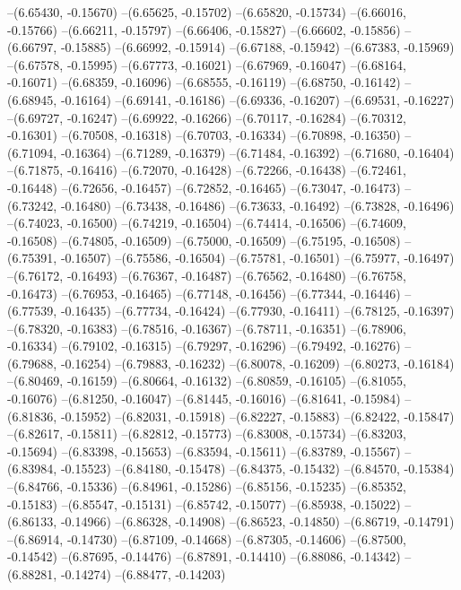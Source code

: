 --(6.65430, -0.15670)
--(6.65625, -0.15702)
--(6.65820, -0.15734)
--(6.66016, -0.15766)
--(6.66211, -0.15797)
--(6.66406, -0.15827)
--(6.66602, -0.15856)
--(6.66797, -0.15885)
--(6.66992, -0.15914)
--(6.67188, -0.15942)
--(6.67383, -0.15969)
--(6.67578, -0.15995)
--(6.67773, -0.16021)
--(6.67969, -0.16047)
--(6.68164, -0.16071)
--(6.68359, -0.16096)
--(6.68555, -0.16119)
--(6.68750, -0.16142)
--(6.68945, -0.16164)
--(6.69141, -0.16186)
--(6.69336, -0.16207)
--(6.69531, -0.16227)
--(6.69727, -0.16247)
--(6.69922, -0.16266)
--(6.70117, -0.16284)
--(6.70312, -0.16301)
--(6.70508, -0.16318)
--(6.70703, -0.16334)
--(6.70898, -0.16350)
--(6.71094, -0.16364)
--(6.71289, -0.16379)
--(6.71484, -0.16392)
--(6.71680, -0.16404)
--(6.71875, -0.16416)
--(6.72070, -0.16428)
--(6.72266, -0.16438)
--(6.72461, -0.16448)
--(6.72656, -0.16457)
--(6.72852, -0.16465)
--(6.73047, -0.16473)
--(6.73242, -0.16480)
--(6.73438, -0.16486)
--(6.73633, -0.16492)
--(6.73828, -0.16496)
--(6.74023, -0.16500)
--(6.74219, -0.16504)
--(6.74414, -0.16506)
--(6.74609, -0.16508)
--(6.74805, -0.16509)
--(6.75000, -0.16509)
--(6.75195, -0.16508)
--(6.75391, -0.16507)
--(6.75586, -0.16504)
--(6.75781, -0.16501)
--(6.75977, -0.16497)
--(6.76172, -0.16493)
--(6.76367, -0.16487)
--(6.76562, -0.16480)
--(6.76758, -0.16473)
--(6.76953, -0.16465)
--(6.77148, -0.16456)
--(6.77344, -0.16446)
--(6.77539, -0.16435)
--(6.77734, -0.16424)
--(6.77930, -0.16411)
--(6.78125, -0.16397)
--(6.78320, -0.16383)
--(6.78516, -0.16367)
--(6.78711, -0.16351)
--(6.78906, -0.16334)
--(6.79102, -0.16315)
--(6.79297, -0.16296)
--(6.79492, -0.16276)
--(6.79688, -0.16254)
--(6.79883, -0.16232)
--(6.80078, -0.16209)
--(6.80273, -0.16184)
--(6.80469, -0.16159)
--(6.80664, -0.16132)
--(6.80859, -0.16105)
--(6.81055, -0.16076)
--(6.81250, -0.16047)
--(6.81445, -0.16016)
--(6.81641, -0.15984)
--(6.81836, -0.15952)
--(6.82031, -0.15918)
--(6.82227, -0.15883)
--(6.82422, -0.15847)
--(6.82617, -0.15811)
--(6.82812, -0.15773)
--(6.83008, -0.15734)
--(6.83203, -0.15694)
--(6.83398, -0.15653)
--(6.83594, -0.15611)
--(6.83789, -0.15567)
--(6.83984, -0.15523)
--(6.84180, -0.15478)
--(6.84375, -0.15432)
--(6.84570, -0.15384)
--(6.84766, -0.15336)
--(6.84961, -0.15286)
--(6.85156, -0.15235)
--(6.85352, -0.15183)
--(6.85547, -0.15131)
--(6.85742, -0.15077)
--(6.85938, -0.15022)
--(6.86133, -0.14966)
--(6.86328, -0.14908)
--(6.86523, -0.14850)
--(6.86719, -0.14791)
--(6.86914, -0.14730)
--(6.87109, -0.14668)
--(6.87305, -0.14606)
--(6.87500, -0.14542)
--(6.87695, -0.14476)
--(6.87891, -0.14410)
--(6.88086, -0.14342)
--(6.88281, -0.14274)
--(6.88477, -0.14203)
